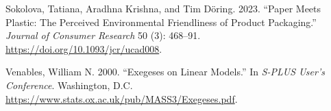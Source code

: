 \documentclass[
  11pt,
  letterpaper,
]{scrbook}
\newlength{\cslhangindent}
\newenvironment{CSLReferences}[2] %
 {\begin{list}{}{%
  \setlength{\itemindent}{0pt}
  \setlength{\leftmargin}{0pt}
  \setlength{\parsep}{0pt}
  \ifodd #1
   \setlength{\leftmargin}{\cslhangindent}
   \setlength{\itemindent}{-1\cslhangindent}
  \fi
  \setlength{\itemsep}{#2\baselineskip}}}
 {\end{list}}
\theoremstyle{plain}
\theoremstyle{definition}
\theoremstyle{definition}
\theoremstyle{plain}
\theoremstyle{remark}
\begin{document}
\begin{CSLReferences}{1}{0}
Sokolova, Tatiana, Aradhna Krishna, and Tim Döring. 2023. {``Paper Meets
Plastic: The Perceived Environmental Friendliness of Product
Packaging.''} \emph{Journal of Consumer Research} 50 (3): 468--91.
\url{https://doi.org/10.1093/jcr/ucad008}.

Venables, William N. 2000. {``Exegeses on Linear Models.''} In
\emph{S-PLUS User's Conference}. Washington, D.C.
\url{https://www.stats.ox.ac.uk/pub/MASS3/Exegeses.pdf}.

\end{CSLReferences}


\backmatter
\end{document}
